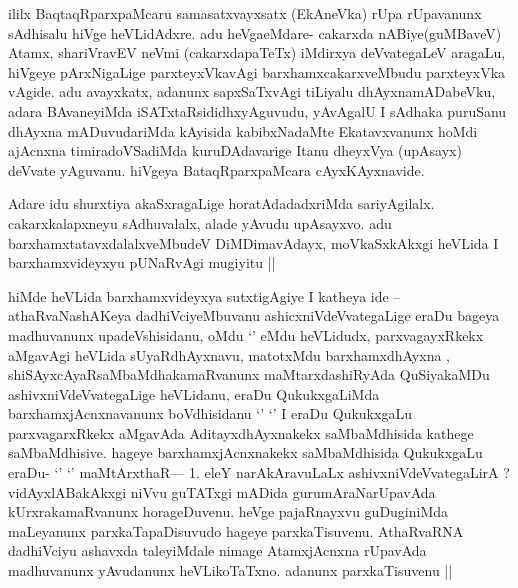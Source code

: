 \begin{center}


\end{center}

\begin{artha}
ililx BaqtaqRparxpaMcaru samasatxvayxsatx (EkAneVka) rUpa rUpavanunx sAdhisalu hiVge heVLidAdxre. adu heVgaeMdare- cakarxda nABiye(guMBaveV) Atamx, shariVravEV neVmi (cakarxdapaTeTx) iMdirxya deVvategaLeV aragaLu, hiVgeye pArxNigaLige parxteyxVkavAgi barxhamxcakarxveMbudu parxteyxVka vAgide. adu avayxkatx, adanunx sapxSaTxvAgi tiLiyalu dhAyxnamADabeVku, adara BAvaneyiMda iSATxtaRsididhxyAguvudu, yAvAgalU I sAdhaka puruSanu dhAyxna mADuvudariMda kAyisida kabibxNadaMte Ekatavxvanunx hoMdi ajAcnxna timiradoVSadiMda kuruDAdavarige Itanu dheyxVya (upAsayx) deVvate  yAguvanu. hiVgeya BataqRparxpaMcara cAyxKAyxnavide.
\end{artha}

\begin{center}


\end{center}

\begin{artha}
Adare idu shurxtiya akaSxragaLige horatAdadadxriMda sariyAgilalx. cakarxkalapxneyu 
sAdhuvalalx, alade yAvudu upAsayxvo. adu barxhamxtatavxdalalxveMbudeV DiMDimavAdayx, 
moVkaSxkAkxgi heVLida I barxhamxvideyxyu pUNaRvAgi mugiyitu ||
\end{artha}

\begin{artha}
hiMde heVLida barxhamxvideyxya sutxtigAgiye I katheya ide -- athaRvaNashAKeya dadhiVciyeMbuvanu ashicxniVdeVvategaLige eraDu bageya madhuvanunx upadeVshisidanu, oMdu `\stext' eMdu heVLidudx, parxvagayxRkekx aMgavAgi heVLida sUyaRdhAyxnavu, matotxMdu barxhamxdhAyxna , shiSAyxcAyaRsaMbaMdhakamaRvanunx maMtarxdashiRyAda QuSiyakaMDu ashivxniVdeVvategaLige heVLidanu, eraDu QukukxgaLiMda barxhamxjAcnxnavanunx boVdhisidanu
`\stext' `\stext' I eraDu QukukxgaLu parxvagarxRkekx aMgavAda AditayxdhAyxnakekx saMbaMdhisida kathege saMbaMdhisive. hageye barxhamxjAcnxnakekx saMbaMdhisida QukukxgaLu eraDu- `\stext' `\stext'  maMtArxthaR--- 1. eleY narAkAravuLaLx ashivxniVdeVvategaLirA ? vidAyxlABakAkxgi niVvu guTATxgi mADida gurumAraNarUpavAda kUrxrakamaRvanunx horageDuvenu. heVge pajaRnayxvu guDuginiMda maLeyanunx parxkaTapaDisuvudo hageye parxkaTisuvenu. AthaRvaRNA dadhiVciyu ashavxda taleyiMdale nimage AtamxjAcnxna rUpavAda madhuvanunx yAvudanunx heVLikoTaTxno. adanunx parxkaTisuvenu ||
\end{artha}

